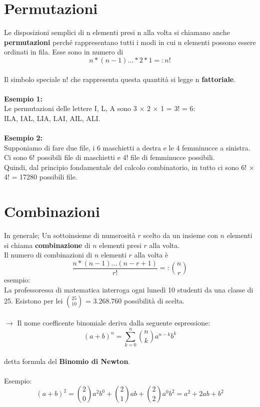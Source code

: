 \documentclass[12pt, letterpaper]{article}
\begin{document}
\section{Permutazioni}

Le disposizioni semplici di n elementi presi n alla volta si chiamano anche
\textbf{permutazioni} perché rappresentano tutti i modi in cui n elementi possono
essere ordinati in fila. Esse sono in numero di
 \[n * (n - 1) ... * 2 * 1 =: n!\] 
\\
Il simbolo speciale n! che rappresenta questa quantità si legge n
\textbf{fattoriale}.
\\
\\
\textbf{Esempio 1:}\\
Le permutazioni delle lettere I, L, A sono
3 × 2 × 1 = 3! = 6:
\\ILA, IAL, LIA, LAI, AIL, ALI.
\\
\\\textbf{Esempio 2:}
\\Supponiamo di fare due file, i 6 maschietti a
destra e le 4 femminucce a sinistra.
Ci sono 6! possibili file di maschietti e 4! file di femminucce possibili.
\\Quindi, dal principio fondamentale del calcolo combinatorio, in
tutto ci sono 6! × 4! = 17280 possibili file.

\section{Combinazioni}

In generale; Un sottoinsieme di numerosità $r$ scelto da un insieme con $n$ elementi si chiama
\textbf{combinazione} di $n$ elementi presi $r$ alla volta.
\\
Il numero di combinazioni di $n$ elementi $r$ alla volta è
\[\frac{n * (n - 1) ... (n - r + 1)}{r!} =: {{n}\choose{r}}\]
esempio:
\\
La professoressa di matematica interroga ogni lunedì 10
studenti da una classe di 25. Esistono per lei ${{25}\choose{10}}$ = 3.268.760
possibilità di scelta.
\\
\\
$\rightarrow$ Il nome coefficente binomiale deriva dalla seguente espressione:
\\
\[(a+b)^n = \sum_{k=0}^n {{n}\choose{k}} a^{n-k}b^k\]
\\
detta formula del \textbf{Binomio di Newton}.
\\
\\
Esempio: \\
\[(a+b)^2 = {{2}\choose{0}} a^2 b^0 + {{2}\choose{1}}ab + {{2}\choose{2}}a^0 b^2 = a^2 + 2ab + b^2\]
\end{document}
